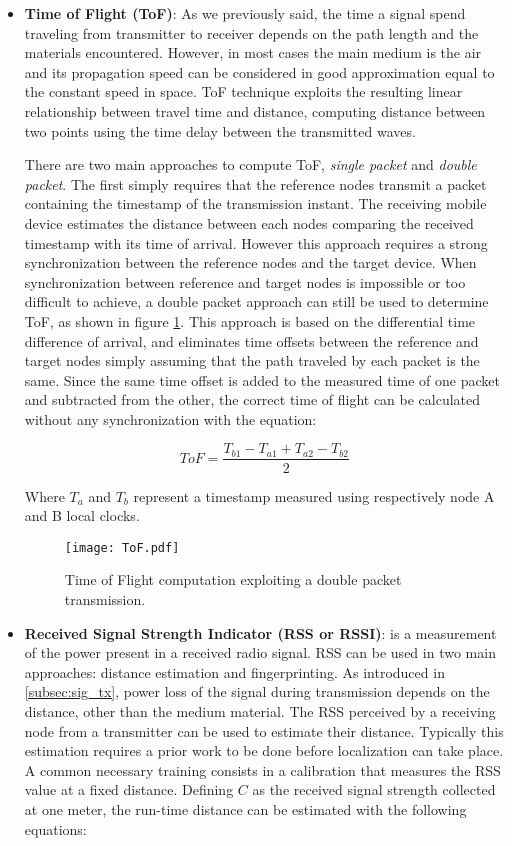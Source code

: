 \begin{itemize}
\item \textbf{Time of Flight (ToF)}: As we previously said, the time a signal spend traveling from transmitter to receiver depends on the path length and the materials encountered. However, in most cases the main medium is the air and its propagation speed can be considered in good approximation equal to the constant speed in space. ToF technique exploits the resulting linear relationship between travel time and distance, computing distance between two points using the time delay between the transmitted waves.

There are two main approaches to compute ToF, \emph{single packet} and \emph{double packet}. The first simply requires that the reference nodes transmit a packet containing the timestamp of the transmission instant. The receiving mobile device estimates the distance between each nodes comparing the received timestamp with its time of arrival. However this approach requires a strong synchronization between the reference nodes and the target device.
When synchronization between reference and target nodes is impossible or too difficult to achieve, a double packet approach can still be used to determine ToF, as shown in figure \ref{fig:ToF}. This approach is based on the differential time difference of arrival, and eliminates time offsets between the reference and target nodes simply assuming that the path traveled by each packet is the same. Since the same time offset is added to the measured
time of one packet and subtracted from the other, the correct time of flight can be calculated without any synchronization with the equation:

\begin{equation}\label{eq:ToF}
ToF = \frac{T_{b1} - T_{a1} + T_{a2} - T_{b2}}{2} 
\end{equation}

Where $T_{a}$ and $T_{b}$ represent a timestamp measured using respectively node A and B local clocks.

\begin{figure}[h!tb]
\centering\texttt{[image: ToF.pdf]}
\caption{Time of Flight computation exploiting a double packet transmission.}
\label{fig:ToF}
\end{figure}

\item \textbf{Received Signal Strength Indicator (RSS or RSSI)}: is a measurement of the power present in a received radio signal. RSS can be used in two main approaches: distance estimation and fingerprinting. As introduced in \ref{subsec:sig_tx}, power loss of the signal during transmission depends on the distance, other than the medium material. The RSS perceived by a receiving node from a transmitter can be used to estimate their distance. Typically this estimation requires a prior work to be done before localization can take place. A common necessary training consists in a calibration that measures the RSS value at a fixed distance. Defining $C$ as the received signal strength collected at one meter, the run-time distance can be estimated with the following equations:


\end{itemize}
